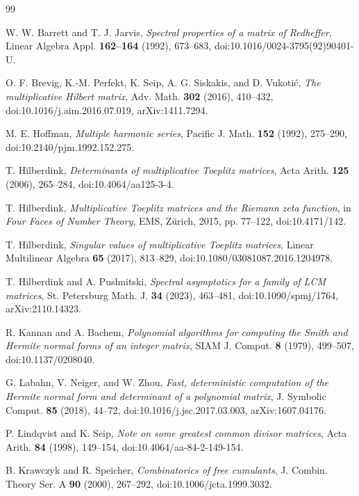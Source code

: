 \documentclass[11pt]{amsart}
\numberwithin{equation}{section}
\theoremstyle{plain}
\theoremstyle{definition}
\theoremstyle{remark}
\begin{document}
\begingroup
\raggedright
\begin{thebibliography}{99}

W. W. Barrett and T. J. Jarvis,
\emph{Spectral properties of a matrix of Redheffer},
Linear Algebra Appl. \textbf{162--164} (1992), 673--683,
doi:10.1016/0024-3795(92)90401-U.

O. F. Brevig, K.-M. Perfekt, K. Seip, A. G. Siskakis, and D. Vukoti\'c,
\emph{The multiplicative Hilbert matrix},
Adv. Math. \textbf{302} (2016), 410--432,
doi:10.1016/j.aim.2016.07.019,
arXiv:1411.7294.

M. E. Hoffman,
\emph{Multiple harmonic series},
Pacific J. Math. \textbf{152} (1992), 275--290,
doi:10.2140/pjm.1992.152.275.

T. Hilberdink,
\emph{Determinants of multiplicative Toeplitz matrices},
Acta Arith. \textbf{125} (2006), 265--284,
doi:10.4064/aa125-3-4.

T. Hilberdink,
\emph{Multiplicative Toeplitz matrices and the Riemann zeta function},
in \emph{Four Faces of Number Theory}, EMS, Z\"urich, 2015, pp. 77--122,
doi:10.4171/142.

T. Hilberdink,
\emph{Singular values of multiplicative Toeplitz matrices},
Linear Multilinear Algebra \textbf{65} (2017), 813--829,
doi:10.1080/03081087.2016.1204978.

T. Hilberdink and A. Pushnitski,
\emph{Spectral asymptotics for a family of LCM matrices},
St. Petersburg Math. J. \textbf{34} (2023), 463--481,
doi:10.1090/spmj/1764,
arXiv:2110.14323.

R. Kannan and A. Bachem,
\emph{Polynomial algorithms for computing the Smith and Hermite normal forms of an integer matrix},
SIAM J. Comput. \textbf{8} (1979), 499--507,
doi:10.1137/0208040.

G. Labahn, V. Neiger, and W. Zhou,
\emph{Fast, deterministic computation of the Hermite normal form and determinant of a polynomial matrix},
J. Symbolic Comput. \textbf{85} (2018), 44--72,
doi:10.1016/j.jsc.2017.03.003,
arXiv:1607.04176.

P. Lindqvist and K. Seip,
\emph{Note on some greatest common divisor matrices},
Acta Arith. \textbf{84} (1998), 149--154,
doi:10.4064/aa-84-2-149-154.

B. Krawczyk and R. Speicher,
\emph{Combinatorics of free cumulants},
J. Combin. Theory Ser. A \textbf{90} (2000), 267--292,
doi:10.1006/jcta.1999.3032.


\end{thebibliography}
\end{document}
